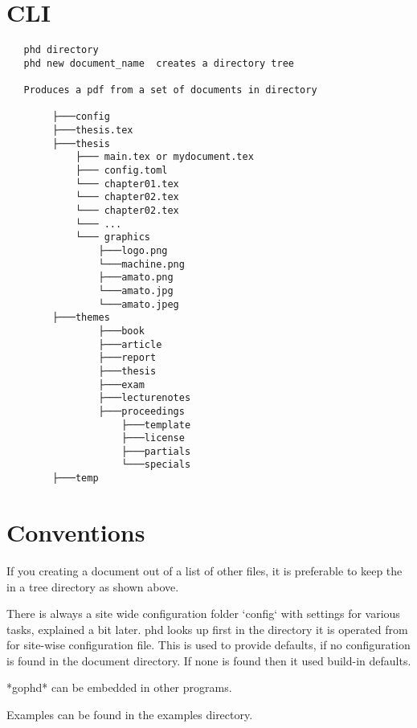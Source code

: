 \section{CLI}
  \begin{verbatim}
   phd directory  
   phd new document_name  creates a directory tree

   Produces a pdf from a set of documents in directory

		├───config
		├───thesis.tex
		├───thesis
			├─── main.tex or mydocument.tex
			├─── config.toml
		    └─── chapter01.tex
		    └─── chapter02.tex
		    └─── chapter02.tex
		    └─── ...
		    └─── graphics
			    ├───logo.png
				└───machine.png
				├───amato.png
			    └───amato.jpg
			    └───amato.jpeg
		├───themes
				├───book
				├───article
				├───report
				├───thesis
				├───exam
				├───lecturenotes
				├───proceedings
					├───template
					├───license
					├───partials
		    		└───specials
		├───temp
	\end{verbatim}	

\section{Conventions}

If you creating a document out of a list of other files, it is preferable to keep the in a tree directory as shown above.

There is always a site wide configuration folder `config` with settings for various tasks, explained a bit later. phd looks up first in the directory it is operated from for site-wise configuration file. This is used to provide defaults, if no configuration is found
in the document directory. If none is found then it used build-in defaults.

*gophd* can be embedded in other programs.

Examples can be found in the examples directory.






